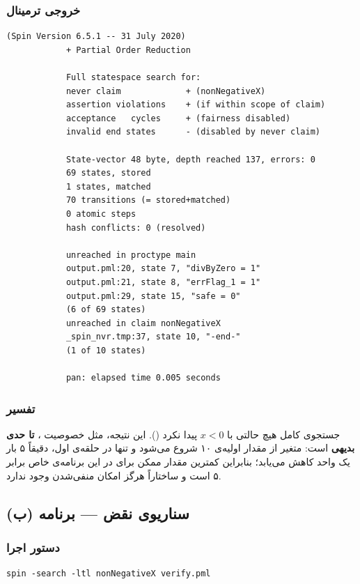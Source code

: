 \documentclass[12pt]{report}
\begin{document}
	\subsubsection{خروجی ترمینال}
	\begin{latin}
		\begin{lstlisting}[style=termstyle]
			(Spin Version 6.5.1 -- 31 July 2020)
			+ Partial Order Reduction
			
			Full statespace search for:
			never claim             + (nonNegativeX)
			assertion violations    + (if within scope of claim)
			acceptance   cycles     + (fairness disabled)
			invalid end states      - (disabled by never claim)
			
			State-vector 48 byte, depth reached 137, errors: 0
			69 states, stored
			1 states, matched
			70 transitions (= stored+matched)
			0 atomic steps
			hash conflicts: 0 (resolved)
			
			unreached in proctype main
			output.pml:20, state 7, "divByZero = 1"
			output.pml:21, state 8, "errFlag_1 = 1"
			output.pml:29, state 15, "safe = 0"
			(6 of 69 states)
			unreached in claim nonNegativeX
			_spin_nvr.tmp:37, state 10, "-end-"
			(1 of 10 states)
			
			pan: elapsed time 0.005 seconds
		\end{lstlisting}
	\end{latin}
	
	\subsubsection{تفسیر}
	جستجوی کامل هیچ حالتی با $x < 0$ پیدا نکرد (). این نتیجه، مثل خصوصیت ، \textbf{تا حدی بدیهی} است: متغیر  از مقدار اولیه‌ی ۱۰ شروع می‌شود و تنها در حلقه‌ی اول، دقیقاً ۵ بار یک واحد کاهش می‌یابد؛ بنابراین کمترین مقدار ممکن برای  در این برنامه‌ی خاص برابر ۵ است و ساختاراً هرگز امکان منفی‌شدن وجود ندارد.
	
	\subsection{سناریوی نقض --- برنامه (ب)}
	
	\subsubsection{دستور اجرا}
	\begin{latin}
		\begin{lstlisting}[style=codestyle]
			spin -search -ltl nonNegativeX verify.pml
		\end{lstlisting}
	\end{latin}
	
\end{document}
